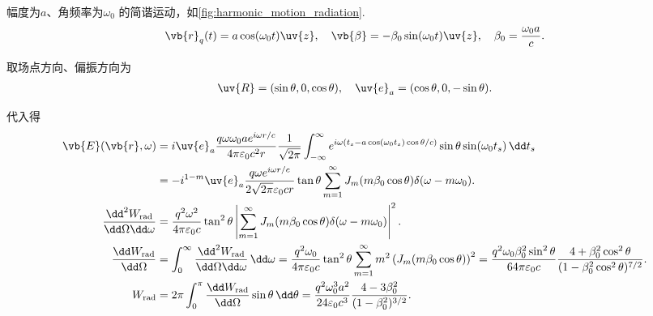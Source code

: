 \begin{exbox}
	幅度为\(a\)、角频率为\(\omega_{0}\) 的简谐运动，如\cref{fig:harmonic_motion_radiation}.
	\begin{align*}
		\vb{r}_{q}(t) = a \cos(\omega_{0} t) \uv{z}, \quad \vb{\beta} = -\beta_{0} \sin(\omega_{0} t) \uv{z}, \quad \beta_{0} = \frac{\omega_{0} a}{c}.
	\end{align*}

	取场点方向、偏振方向为
	\begin{align*}
		\uv{R} = (\sin\theta, 0, \cos\theta), \quad \uv{e}_{a} = (\cos\theta, 0, -\sin\theta).
	\end{align*}

	代入得
	\begin{align*}
		\vb{E}(\vb{r}, \omega) &= i \uv{e}_{a} \frac{q \omega \omega_{0} a e^{i\omega r/c}}{4\pi \varepsilon_{0} c^{2} r} \frac{1}{\sqrt{2\pi}} \int_{-\infty}^{\infty} e^{i\omega \left( t_{s} - a \cos(\omega_{0} t_{s}) \cos\theta/c \right)} \sin\theta \sin(\omega_{0} t_{s}) \, \dd t_{s} \\
		&= -i^{1-m} \uv{e}_{a} \frac{q \omega e^{i\omega r/c}}{2\sqrt{2\pi} \varepsilon_{0} c r} \tan\theta \sum_{m=1}^{\infty} J_{m}(m\beta_{0} \cos\theta) \delta(\omega - m\omega_{0}). \\
		\frac{\dd^{2} W_{\mathrm{rad}}}{\dd \Omega \dd \omega} &= \frac{q^{2} \omega^{2}}{4\pi \varepsilon_{0} c} \tan^{2}\theta \left| \sum_{m=1}^{\infty} J_{m}(m\beta_{0} \cos\theta) \delta(\omega - m\omega_{0}) \right|^{2}. \\
		\frac{\dd  W_{\mathrm{rad}}}{\dd \Omega} &= \int_{0}^{\infty} \frac{\dd^{2} W_{\mathrm{rad}}}{\dd \Omega \dd \omega} \, \dd \omega = \frac{q^{2} \omega_{0}}{4\pi \varepsilon_{0} c} \tan^{2}\theta \sum_{m=1}^{\infty} m^{2} \left( J_{m}(m\beta_{0} \cos\theta) \right)^{2} = \frac{q^{2} \omega_{0} \beta_{0}^{2} \sin^{2}\theta}{64\pi \varepsilon_{0} c} \frac{4 + \beta_{0}^{2} \cos^{2}\theta}{(1 - \beta_{0}^{2} \cos^{2}\theta)^{7/2}}. \\
		W_{\mathrm{rad}} &= 2\pi \int_{0}^{\pi} \frac{\dd  W_{\mathrm{rad}}}{\dd \Omega} \sin\theta \, \dd \theta = \frac{q^{2} \omega_{0}^{3} a^{2}}{24 \varepsilon_{0} c^{3}} \frac{4 - 3\beta_{0}^{2}}{(1 - \beta_{0}^{2})^{3/2}}.
	\end{align*}
\end{exbox}
